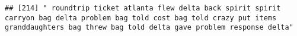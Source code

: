 \documentclass[
]{article}
\begin{document}
\begin{verbatim}
## [214] " roundtrip ticket atlanta flew delta back spirit spirit carryon bag delta problem bag told cost bag told crazy put items granddaughters bag threw bag told delta gave problem response delta"                                                                                                                                                                                                                                                                                                                                                                                                                                                                                                                                                                                                                                                                                                                                                                                                                                                                                                                                                                                                                                                                                                                                                                                                                                                                                                                                                                                                                                                                                                                                                                                                  

\end{verbatim}
\end{document}
